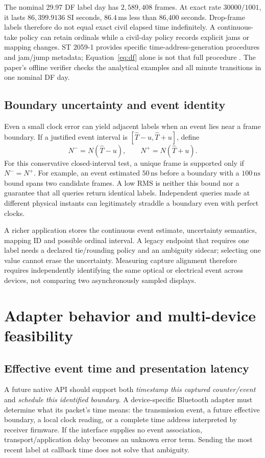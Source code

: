 \documentclass[11pt,letterpaper]{article}
\newcommand{\ns}{\,\mathrm{ns}}\newcommand{\ms}{\,\mathrm{ms}}\newcommand{\ppm}{\,\mathrm{ppm}}
\begin{document}
The nominal 29.97 DF label day has $2{,}589{,}408$ frames. At exact rate $30000/1001$, it lasts $86{,}399.9136$ SI seconds, $86.4\ms$ less than 86,400 seconds. Drop-frame labels therefore do not equal exact civil elapsed time indefinitely. A continuous-take policy can retain ordinals while a civil-day policy records explicit jams or mapping changes. ST 2059-1 provides specific time-address-generation procedures and jam/jump metadata; Equation~\ref{eq:df} alone is not that full procedure \cite{st2059}. The paper's offline verifier checks the analytical examples and all minute transitions in one nominal DF day.

\subsection{Boundary uncertainty and event identity}
Even a small clock error can yield adjacent labels when an event lies near a frame boundary. If a justified event interval is $[\widehat T-u,\widehat T+u]$, define
\begin{equation}
 N^- = N(\widehat T-u),\qquad N^+=N(\widehat T+u).\label{eq:ambiguous}
\end{equation}
For this conservative closed-interval test, a unique frame is supported only if $N^-=N^+$. For example, an event estimated $50\ns$ before a boundary with a $100\ns$ bound spans two candidate frames. A low RMS is neither this bound nor a guarantee that all queries return identical labels. Independent queries made at different physical instants can legitimately straddle a boundary even with perfect clocks.

A richer application stores the continuous event estimate, uncertainty semantics, mapping ID and possible ordinal interval. A legacy endpoint that requires one label needs a declared tie/rounding policy and an ambiguity sidecar; selecting one value cannot erase the uncertainty. Measuring capture alignment therefore requires independently identifying the same optical or electrical event across devices, not comparing two asynchronously sampled displays.

\section{Adapter behavior and multi-device feasibility}\label{sec:adapters}
\subsection{Effective event time and presentation latency}
A future native API should support both \emph{timestamp this captured counter/event} and \emph{schedule this identified boundary}. A device-specific Bluetooth adapter must determine what its packet's time means: the transmission event, a future effective boundary, a local clock reading, or a complete time address interpreted by receiver firmware. If the interface supplies no event association, transport/application delay becomes an unknown error term. Sending the most recent label at callback time does not solve that ambiguity.
\end{document}
